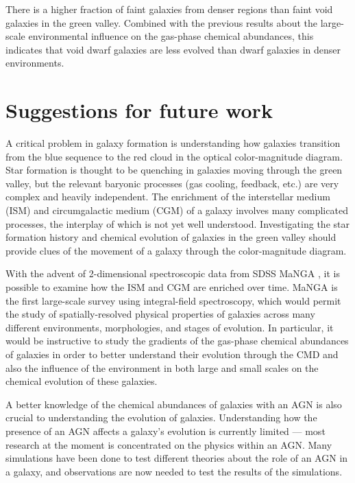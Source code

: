 There is a higher fraction of faint galaxies from denser regions than faint void 
galaxies in the green valley.  Combined with the previous results about the 
large-scale environmental influence on the gas-phase chemical abundances, this 
indicates that void dwarf galaxies are less evolved than dwarf galaxies in 
denser environments.


\section[Future work]{Suggestions for future work}



A critical problem in galaxy formation is understanding how galaxies transition 
from the blue sequence to the red cloud in the optical color-magnitude diagram.  
Star formation is thought to be quenching in galaxies moving through the green 
valley, but the relevant baryonic processes (gas cooling, feedback, etc.) are 
very complex and heavily independent.  The enrichment of the interstellar medium 
(ISM) and circumgalactic medium (CGM) of a galaxy involves many complicated 
processes, the interplay of which is not yet well understood.  Investigating the 
star formation history and chemical evolution of galaxies in the green valley 
should provide clues of the movement of a galaxy through the color-magnitude 
diagram.

With the advent of 2-dimensional spectroscopic data from SDSS MaNGA \citep{MaNGA,
SDSS13}, it is possible to examine how the ISM and CGM are enriched over time.  
MaNGA is the first large-scale survey using integral-field spectroscopy, which 
would permit the study of spatially-resolved physical properties of galaxies 
across many different environments, morphologies, and stages of evolution.  In 
particular, it would be instructive to study the gradients of the gas-phase 
chemical abundances of galaxies in order to better understand their evolution 
through the CMD and also the influence of the environment in both large and 
small scales on the chemical evolution of these galaxies.

A better knowledge of the chemical abundances of galaxies with an AGN is also 
crucial to understanding the evolution of galaxies.  Understanding how the 
presence of an AGN affects a galaxy's evolution is currently limited --- most 
research at the moment is concentrated on the physics within an AGN.  Many 
simulations have been done to test different theories about the role of an AGN 
in a galaxy, and observations are now needed to test the results of the 
simulations.


